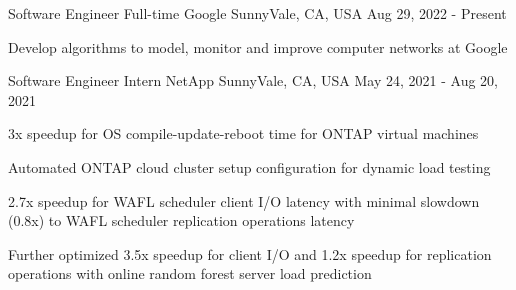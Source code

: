 

\begin{cventries}
  \cventry
    {Software Engineer Full-time} %
    {Google} %
    {SunnyVale, CA, USA} %
    {Aug 29, 2022 - Present} %
    {
      \begin{cvitems} %
        \item {Develop algorithms to model, monitor and improve computer
		       networks at Google}
      \end{cvitems}
    }

  \cventry
    {Software Engineer Intern} %
    {NetApp} %
    {SunnyVale, CA, USA} %
    {May 24, 2021 - Aug 20, 2021} %
    {
      \begin{cvitems} %
        \item {3x speedup for OS compile-update-reboot time for ONTAP virtual machines}
        \item {Automated ONTAP cloud cluster setup configuration for dynamic load testing}
        \item {2.7x speedup for WAFL scheduler client I/O latency with minimal
               slowdown (0.8x) to WAFL scheduler replication operations latency}
        \item {Further optimized 3.5x speedup for client I/O and 1.2x speedup
               for replication operations with online random forest server
               load prediction}
      \end{cvitems}
    }


\end{cventries}
